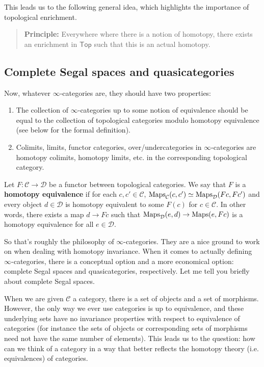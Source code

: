 \documentclass{amsart}
\begin{document}
This leads us to the following general idea, which highlights the importance of
topological enrichment.
\begin{quote}
    \textbf{Principle:} Everywhere where there is a notion of homotopy, there exists
    an enrichment in $\mathsf{Top}$ such that this is an actual homotopy.
\end{quote}

\subsection{Complete Segal spaces and quasicategories}

Now, whatever $\infty$-categories are, they should have two properties:
\begin{enumerate}
    \item The collection of $\infty$-categories up to some notion of equivalence
        should be equal to the collection of topological categories modulo
        homotopy equivalence (see below for the formal definition).
    \item Colimits, limits, functor categories, over/undercategories in
        $\infty$-categories are homotopy colimits, homotopy limits, etc. in
        the corresponding topological category.
\end{enumerate}

\begin{definition}
    Let $F:\mathcal{C}\to \mathcal{D}$ be a functor between topological categories.
    We say that $F$ is a \textbf{homotopy equivalence} if for each $c,c'\in \mathcal{C}$,
    $\operatorname{Maps}_\mathcal{C}(c,c') \simeq \operatorname{Maps}_\mathcal{D}(Fc,Fc')$ and every object $d\in\mathcal{D}$
    is homotopy equivalent to some $F(c)$ for $c\in\mathcal{C}$. In other words, there exists a map
    $d\to Fc$ such that $\operatorname{Maps}_\mathcal{D}(e, d)\to \operatorname{Maps}(e,Fc)$ is a homotopy equivalence
    for all $e\in\mathcal{D}$.
\end{definition}

So that's roughly the philosophy of $\infty$-categories. They are a nice ground to work
on when dealing with homotopy invariance. When it comes to actually defining $\infty$-categories,
there is a conceptual option and a more economical option: complete Segal spaces and quasicategories,
respectively. Let me tell you briefly about complete Segal spaces.

When we are given $\mathcal{C}$ a category, there is a set of objects and a set of morphisms.
However, the only way we ever use categories is up to equivalence, and these underlying sets have
no invariance properties with respect to equivalence of categories (for instance the sets of objects
or corresponding sets of morphisms need not have the same number of elements).
This leads us to the question: how can we think of a category in a way that better reflects 
the homotopy theory (i.e. equivalences) of categories.
\end{document}
